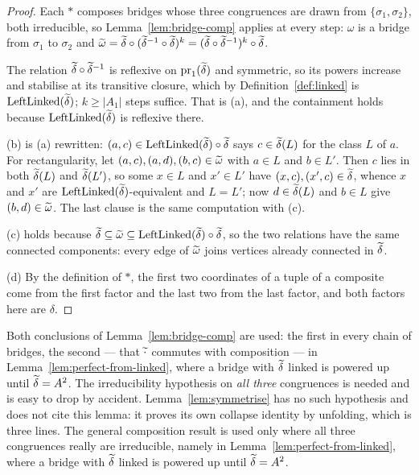 \begin{proof}
Each $\ast$ composes bridges whose three congruences are drawn from
$\{\sigma_{1},\sigma_{2}\}$, both irreducible, so
Lemma~\ref{lem:bridge-comp} applies at every step: $\omega$ is a bridge from
$\sigma_{1}$ to $\sigma_{2}$ and
$\widetilde{\omega}=\widetilde{\delta}\circ(\widetilde{\delta}^{-1}\circ\widetilde{\delta})^{k}
=(\widetilde{\delta}\circ\widetilde{\delta}^{-1})^{k}\circ\widetilde{\delta}$.

The relation $\widetilde{\delta}\circ\widetilde{\delta}^{-1}$ is reflexive on
$\operatorname*{pr}_{1}(\widetilde{\delta})$ and symmetric, so its powers increase and stabilise at
its transitive closure, which by Definition~\ref{def:linked} is
$\operatorname{LeftLinked}(\widetilde{\delta})$; $k\ge|A_{1}|$ steps suffice. That is (a), and the
containment holds because $\operatorname{LeftLinked}(\widetilde{\delta})$ is reflexive there.

(b) is (a) rewritten: $(a,c)\in\operatorname{LeftLinked}(\widetilde{\delta})\circ\widetilde{\delta}$ says
$c\in\widetilde{\delta}(L)$ for the class $L$ of $a$. For rectangularity, let
$(a,c),(a,d),(b,c)\in\widetilde{\omega}$ with $a\in L$ and $b\in L'$. Then $c$ lies in
both $\widetilde{\delta}(L)$ and $\widetilde{\delta}(L')$, so some $x\in L$ and $x'\in L'$
have $(x,c),(x',c)\in\widetilde{\delta}$, whence $x$ and $x'$ are
$\operatorname{LeftLinked}(\widetilde{\delta})$-equivalent and $L=L'$; now $d\in\widetilde{\delta}(L)$ and
$b\in L$ give $(b,d)\in\widetilde{\omega}$. The last clause is the same computation
with (c).

(c) holds because $\widetilde{\delta}\subseteq\widetilde{\omega}\subseteq
\operatorname{LeftLinked}(\widetilde{\delta})\circ\widetilde{\delta}$, so the two relations have the same
connected components: every edge of $\widetilde{\omega}$ joins vertices already
connected in $\widetilde{\delta}$.

(d) By the definition of $\ast$, the first two coordinates of a tuple of a
composite come from the first factor and the last two from the last factor,
and both factors here are $\delta$.
\end{proof}

\begin{hazard}\label{haz:bridge-comp}
Both conclusions of Lemma~\ref{lem:bridge-comp} are used: the first in every
chain of bridges, the second --- that $\widetilde{\cdot}$ commutes with composition
--- in Lemma~\ref{lem:perfect-from-linked}, where a bridge with
$\widetilde{\delta}$ linked is powered up until $\widetilde{\delta}=A^{2}$. The
irreducibility hypothesis on \emph{all three} congruences is needed and is easy
to drop by accident. Lemma~\ref{lem:symmetrise} has no such hypothesis and does
not cite this lemma: it proves its own collapse identity by unfolding, which is
three lines. The general composition result is used only where all three
congruences really are irreducible, namely in
Lemma~\ref{lem:perfect-from-linked}, where a bridge with $\widetilde{\delta}$ linked
is powered up until $\widetilde{\delta}=A^{2}$.
\end{hazard}

